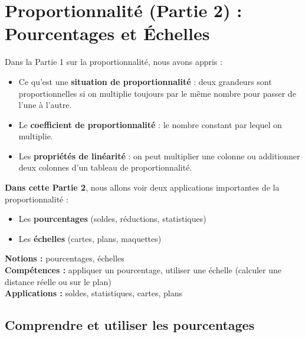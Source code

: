 \chapter{Proportionnalité (Partie 2) : Pourcentages et Échelles}
\label{chap:seq16-proportionnalite-2}

\begin{remarkbox}
	Dans la Partie 1 sur la proportionnalité, nous avons appris :
	\begin{itemize}
		\item Ce qu'est une \textbf{situation de proportionnalité} : deux grandeurs sont proportionnelles si on multiplie toujours par le même nombre pour passer de l'une à l'autre.
		\item Le \textbf{coefficient de proportionnalité} : le nombre constant par lequel on multiplie.
		\item Les \textbf{propriétés de linéarité} : on peut multiplier une colonne ou additionner deux colonnes d'un tableau de proportionnalité.
	\end{itemize}

	\textbf{Dans cette Partie 2}, nous allons voir deux applications importantes de la proportionnalité :
	\begin{itemize}
		\item Les \textbf{pourcentages} (soldes, réductions, statistiques)
		\item Les \textbf{échelles} (cartes, plans, maquettes)
	\end{itemize}
\end{remarkbox}

\seance

\begin{objectifsbox}
	\textbf{Notions :} pourcentages, échelles\\
	\textbf{Compétences :} appliquer un pourcentage, utiliser une échelle (calculer une distance réelle ou sur le plan)\\
	\textbf{Applications :} soldes, statistiques, cartes, plans
\end{objectifsbox}

\section{Comprendre et utiliser les pourcentages}

